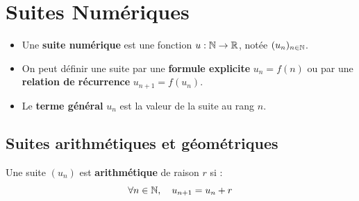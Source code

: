 
\chapter{Suites Num\'{e}riques}

\begin{rappel}
  \begin{itemize}
    \item Une \textbf{suite num\'{e}rique} est une fonction $u : \mathbb{N} \to \mathbb{R}$,
          not\'{e}e $(u_n)_{n \in \mathbb{N}}$.
    \item On peut d\'{e}finir une suite par une \textbf{formule explicite}
          $u_n = f(n)$ ou par une \textbf{relation de r\'{e}currence}
          $u_{n+1} = f(u_n)$.
    \item Le \textbf{terme g\'{e}n\'{e}ral} $u_n$ est la valeur de la suite au rang $n$.
  \end{itemize}
\end{rappel}

\section{Suites arithm\'{e}tiques et g\'{e}om\'{e}triques}

\begin{definition}
  Une suite $(u_n)$ est \textbf{arithm\'{e}tique} de raison $r$ si :
  \[
    \forall n \in \mathbb{N}, \quad u_{n+1} = u_n + r
  \]
\end{definition}

